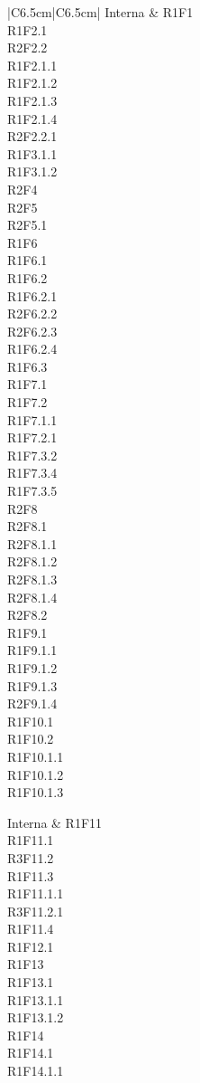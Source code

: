 \begin{longtable}{|C{6.5cm}|C{6.5cm}|}
	Interna &
	\centering
	R1F1\\
	R1F2.1 \\
	R2F2.2\\
	R1F2.1.1\\
	R1F2.1.2\\
	R1F2.1.3\\
	R1F2.1.4\\
	R2F2.2.1\\
	R1F3.1.1\\
	R1F3.1.2\\
	R2F4\\
	R2F5\\
	R2F5.1\\
	R1F6\\
	R1F6.1\\
	R1F6.2\\
	R1F6.2.1\\
	R2F6.2.2\\
	R2F6.2.3\\
	R1F6.2.4\\
	R1F6.3\\
	R1F7.1\\
	R1F7.2\\
	R1F7.1.1\\
	R1F7.2.1\\
	R1F7.3.2\\
	R1F7.3.4\\
	R1F7.3.5\\
	R2F8\\
	R2F8.1\\
	R2F8.1.1\\
	R2F8.1.2\\
	R2F8.1.3\\
	R2F8.1.4\\
	R2F8.2\\
	R1F9.1\\
	R1F9.1.1\\
	R1F9.1.2\\
	R1F9.1.3\\
	R2F9.1.4\\
	R1F10.1\\
	R1F10.2\\
	R1F10.1.1\\
	R1F10.1.2\\
	R1F10.1.3\\
	
	\tabularnewline
	
	Interna &
	\centering
	R1F11\\
	R1F11.1\\
	R3F11.2\\
	R1F11.3\\
	R1F11.1.1\\
	R3F11.2.1\\
	R1F11.4\\
	R1F12.1\\
	R1F13\\
	R1F13.1\\
	R1F13.1.1\\
	R1F13.1.2\\
	R1F14\\
	R1F14.1\\
	R1F14.1.1\\


\end{longtable}
